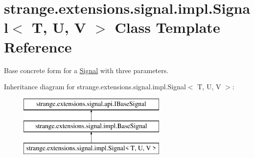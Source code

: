\hypertarget{classstrange_1_1extensions_1_1signal_1_1impl_1_1_signal_3_01_t_00_01_u_00_01_v_01_4}{\section{strange.\-extensions.\-signal.\-impl.\-Signal$<$ T, U, V $>$ Class Template Reference}
\label{classstrange_1_1extensions_1_1signal_1_1impl_1_1_signal_3_01_t_00_01_u_00_01_v_01_4}
}


Base concrete form for a \hyperlink{classstrange_1_1extensions_1_1signal_1_1impl_1_1_signal}{Signal} with three parameters.  


Inheritance diagram for strange.\-extensions.\-signal.\-impl.\-Signal$<$ T, U, V $>$\-:\begin{figure}[H]
\begin{center}
\leavevmode
\includegraphics[height=3.000000cm]{classstrange_1_1extensions_1_1signal_1_1impl_1_1_signal_3_01_t_00_01_u_00_01_v_01_4}
\end{center}
\end{figure}
